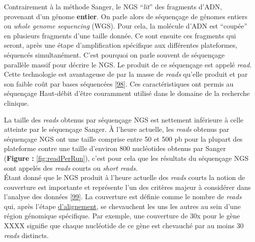 \documentclass[12pt,twoside]{reedthesis}
\theoremstyle{definition}
\theoremstyle{definition}
\theoremstyle{remark}
\begin{document}
  Contrairement à la méthode Sanger, le NGS ``\emph{lit}'' des fragments
  d'ADN, provenant d'un génome \textbf{entier}. On parle alors de
  séquençage de génomes entiers ou \emph{whole genome sequencing} (WGS).
  Pour cela, la molécule d'ADN est ``coupée'' en plusieurs fragments d'une
  taille donnée. Ce sont ensuite ces fragments qui seront, après une étape
  d'amplification spécifique aux différentes plateformes, séquencés
  simultanément. C'est pourquoi on parle souvent de séquençage parallèle
  massif pour décrire le NGS. Le produit de ce séquençage est appelé
  \emph{read}. Cette technologie est avantageuse de par la masse de
  \emph{reads} qu'elle produit et par son faible coût par bases séquencées
  {[}\protect\hyperlink{ref-Metzker2010}{98}{]}. Ces caractéristiques ont
  permis au séquençage Haut-débit d'être couramment utilisé dans le
  domaine de la recherche clinique.
  
  La taille des \emph{reads} obtenus par séquençage NGS est nettement
  inférieure à celle atteinte par le séquençage Sanger. À l'heure
  actuelle, les \emph{reads} obtenus par séquençage NGS ont une taille
  comprise entre 50 et 500 pb pour la plupart des plateforme contre une
  taille d'environ 800 nucléotides obtenus par Sanger (\textbf{Figure :}
  \ref{fig:readPerRun}), c'est pour cela que les résultats du séquençage
  NGS sont appelés des \emph{reads} courts ou \emph{short reads}.\\
  Étant donné que le NGS produit à l'heure actuelle des \emph{reads}
  courts la notion de couverture est importante et représente l'un des
  critères majeur à considérer dans l'analyse des données
  {[}\protect\hyperlink{ref-Sims2014}{99}{]}. La couverture est définie
  comme le nombre de \emph{reads} qui, après l'étape
  \protect\hyperlink{lalignement}{d'alignement}, se chevauchent les uns
  les autres au sein d'une région génomique spécifique. Par exemple, une
  couverture de 30x pour le gène XXXX signifie que chaque nucléotide de ce
  gène est chevauché par au moins 30 \emph{reads} distincts.
  
  \newpage
  
\end{document}
